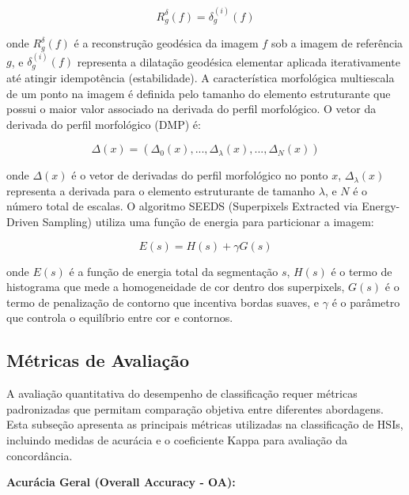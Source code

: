 \begin{equation}
R_g^\delta(f) = \delta_g^{(i)}(f)
\end{equation}

\noindent onde $R_g^\delta(f)$ é a reconstrução geodésica da imagem $f$ sob a imagem de referência $g$, e $\delta_g^{(i)}(f)$ representa a dilatação geodésica elementar aplicada iterativamente até atingir idempotência (estabilidade). A característica morfológica multiescala de um ponto na imagem é definida pelo tamanho do elemento estruturante que possui o maior valor associado na derivada do perfil morfológico. O vetor da derivada do perfil morfológico (DMP) é:

\begin{equation}
\Delta(x) = (\Delta_0(x), ..., \Delta_\lambda(x), ..., \Delta_N(x))
\end{equation}

\noindent onde $\Delta(x)$ é o vetor de derivadas do perfil morfológico no ponto $x$, $\Delta_\lambda(x)$ representa a derivada para o elemento estruturante de tamanho $\lambda$, e $N$ é o número total de escalas. O algoritmo SEEDS (Superpixels Extracted via Energy-Driven Sampling) utiliza uma função de energia para particionar a imagem:

\begin{equation}
E(s) = H(s) + \gamma G(s)
\end{equation}

\noindent onde $E(s)$ é a função de energia total da segmentação $s$, $H(s)$ é o termo de histograma que mede a homogeneidade de cor dentro dos superpixels, $G(s)$ é o termo de penalização de contorno que incentiva bordas suaves, e $\gamma$ é o parâmetro que controla o equilíbrio entre cor e contornos.

\subsection{Métricas de Avaliação}

A avaliação quantitativa do desempenho de classificação requer métricas padronizadas que permitam comparação objetiva entre diferentes abordagens. Esta subseção apresenta as principais métricas utilizadas na classificação de HSIs, incluindo medidas de acurácia e o coeficiente Kappa para avaliação da concordância.

\textbf{Acurácia Geral (Overall Accuracy - OA):}

